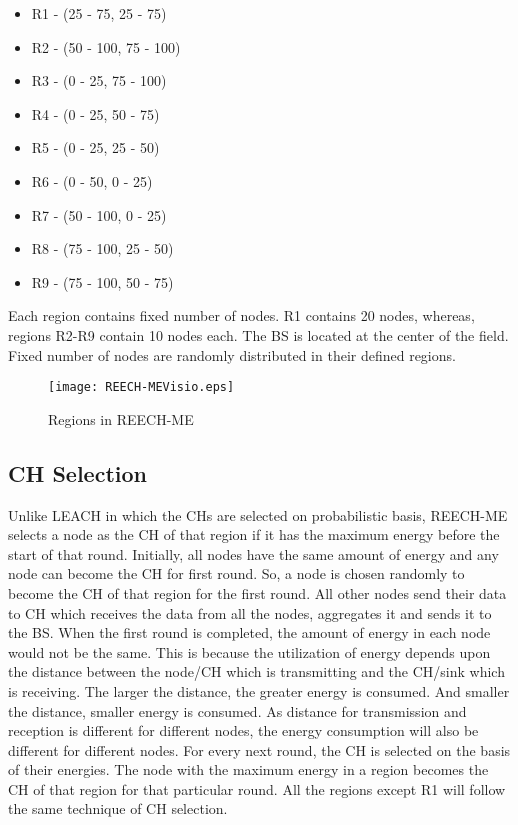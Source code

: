 \documentclass[journal]{IEEEtran}
\begin{document}
\begin{itemize}

  \item R1 - (25 - 75, 25 - 75)

  \item R2 - (50 - 100, 75 - 100)

  \item R3 - (0 - 25, 75 - 100)

  \item R4 - (0 - 25, 50 - 75)

  \item R5 - (0 - 25, 25 - 50)

  \item R6 - (0 - 50, 0 - 25)

  \item R7 - (50 - 100, 0 - 25)

  \item R8 - (75 - 100, 25 - 50)

  \item R9 - (75 - 100, 50 - 75)
\end{itemize}

Each region contains fixed number of nodes. R1 contains 20 nodes, whereas, regions R2-R9 contain 10 nodes each. The BS is located at the center of the field. Fixed number of nodes are randomly distributed in their defined regions.

\begin{figure}[!h]
\centering
\texttt{[image: REECH-MEVisio.eps]}
\caption{Regions in REECH-ME}
\end{figure}

\subsection{CH Selection}
Unlike LEACH in which the CHs are selected on probabilistic basis, REECH-ME selects a node as the CH of that region if it has the maximum energy before the start of that round. Initially, all nodes have the same amount of energy and any node can become the CH for first round. So, a node is chosen randomly to become the CH of that region for the first round. All other nodes send their data to CH which receives the data from all the nodes, aggregates it and sends it to the BS. When the first round is completed, the amount of energy in each node would not be the same. This is because the utilization of energy depends upon the distance between the node/CH which is transmitting and the CH/sink which is receiving. The larger the distance, the greater energy is consumed. And smaller the distance, smaller energy is consumed. As distance for transmission and reception is different for different nodes, the energy consumption will also be different for different nodes. For every next round, the CH is selected on the basis of their energies. The node with the maximum energy in a region becomes the CH of that region for that particular round. All the regions except R1 will follow the same technique of CH selection.
\end{document}
